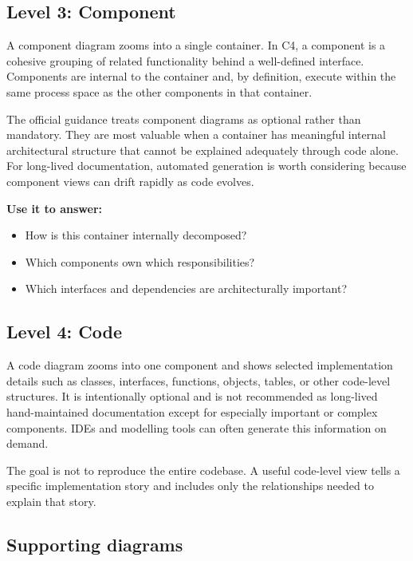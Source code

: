 \documentclass[11pt]{article}
\begin{document}
\subsection{Level 3: Component}

A component diagram zooms into a single container. In C4, a component is a cohesive grouping of related functionality behind a well-defined interface. Components are internal to the container and, by definition, execute within the same process space as the other components in that container.\cite{c4componentabs}

The official guidance treats component diagrams as optional rather than mandatory. They are most valuable when a container has meaningful internal architectural structure that cannot be explained adequately through code alone. For long-lived documentation, automated generation is worth considering because component views can drift rapidly as code evolves.\cite{c4componentdiagram}

\textbf{Use it to answer:}
\begin{itemize}
  \item How is this container internally decomposed?
  \item Which components own which responsibilities?
  \item Which interfaces and dependencies are architecturally important?
\end{itemize}

\subsection{Level 4: Code}

A code diagram zooms into one component and shows selected implementation details such as classes, interfaces, functions, objects, tables, or other code-level structures. It is intentionally optional and is not recommended as long-lived hand-maintained documentation except for especially important or complex components. IDEs and modelling tools can often generate this information on demand.\cite{c4code}

The goal is not to reproduce the entire codebase. A useful code-level view tells a specific implementation story and includes only the relationships needed to explain that story.

\subsection{Supporting diagrams}
\end{document}
